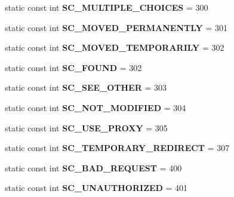 \begin{DoxyCompactItemize}
\mbox{\label{class_response_a37ceb73f6ec0b38578e45d859a8efdf3}} 
static const int {\bfseries S\+C\+\_\+\+M\+U\+L\+T\+I\+P\+L\+E\+\_\+\+C\+H\+O\+I\+C\+ES} = 300
\item 
\mbox{\label{class_response_a86d18e9d38ea9a650cea7de979b65c34}} 
static const int {\bfseries S\+C\+\_\+\+M\+O\+V\+E\+D\+\_\+\+P\+E\+R\+M\+A\+N\+E\+N\+T\+LY} = 301
\item 
\mbox{\label{class_response_a8a25dc231422ee757d560fa8c5c45d4f}} 
static const int {\bfseries S\+C\+\_\+\+M\+O\+V\+E\+D\+\_\+\+T\+E\+M\+P\+O\+R\+A\+R\+I\+LY} = 302
\item 
\mbox{\label{class_response_a1c504fd69000be6893186f008b45fc52}} 
static const int {\bfseries S\+C\+\_\+\+F\+O\+U\+ND} = 302
\item 
\mbox{\label{class_response_a0b30946aa3c4061df49d17f5a782f84b}} 
static const int {\bfseries S\+C\+\_\+\+S\+E\+E\+\_\+\+O\+T\+H\+ER} = 303
\item 
\mbox{\label{class_response_a503b2f7233819ecc7a45d1429c726529}} 
static const int {\bfseries S\+C\+\_\+\+N\+O\+T\+\_\+\+M\+O\+D\+I\+F\+I\+ED} = 304
\item 
\mbox{\label{class_response_a36df217f22171bf1a091d35945dbc02b}} 
static const int {\bfseries S\+C\+\_\+\+U\+S\+E\+\_\+\+P\+R\+O\+XY} = 305
\item 
\mbox{\label{class_response_a51484bc55d86b19cf8bdbad338fc5b7b}} 
static const int {\bfseries S\+C\+\_\+\+T\+E\+M\+P\+O\+R\+A\+R\+Y\+\_\+\+R\+E\+D\+I\+R\+E\+CT} = 307
\item 
\mbox{\label{class_response_ab79ad164134768bb4c9058224e49fb8c}} 
static const int {\bfseries S\+C\+\_\+\+B\+A\+D\+\_\+\+R\+E\+Q\+U\+E\+ST} = 400
\item 
\mbox{\label{class_response_a56132b00661f6c4f5d0c812af6b97283}} 
static const int {\bfseries S\+C\+\_\+\+U\+N\+A\+U\+T\+H\+O\+R\+I\+Z\+ED} = 401
\item 
\mbox{\label{class_response_aa48f48f1f117b470906d54b8b25c98fc}} 

\end{DoxyCompactItemize}
